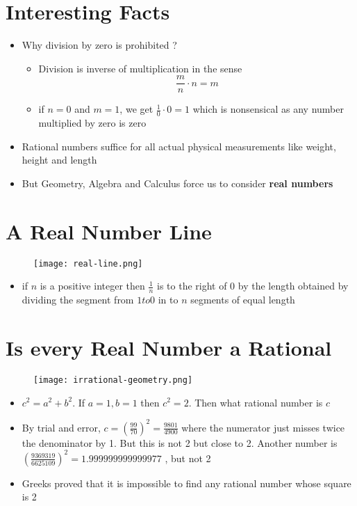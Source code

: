 \section{Interesting Facts}
\begin{itemize}
    \item Why division by zero is prohibited ?
    \begin{itemize}
        \item Division is inverse of multiplication in the sense
        \[
        \frac{m}{n} \cdot n = m
        \]
    \item if \( n=0 \) and \( m = 1\), we get \(\frac{1}{0} \cdot 0 = 1\) which is nonsensical as any number multiplied by zero is zero
    \end{itemize}
    \item Rational numbers suffice for all actual physical measurements like weight, height and length
    \item But Geometry, Algebra and Calculus force us to consider \textbf{real numbers}
\end{itemize}

\section{A Real Number Line}
\begin{figure}[h]
    \centering
    \texttt{[image: real-line.png]}
\end{figure}
\begin{itemize}
    \item if \( n\) is a positive integer then \( \frac{1}{n}\) is to the right of 0 by the length obtained by dividing the segment from \( 1 to 0\) in to \( n \) segments of equal length
\end{itemize}

\section{Is every Real Number a Rational}
\begin{figure}[h]
    \centering
    \texttt{[image: irrational-geometry.png]}
\end{figure}
\begin{itemize}
    \item \( c^{2} = a^{2} + b^{2} \). If \( a = 1, b = 1\) then \(c^{2} = 2 \). Then what rational number is \( c \)
    \item By trial and error, \( c = \left( \frac{99}{70} \right)^{2}  = \frac{9801}{4900}\) where the numerator just misses twice the denominator by 1. But this is not 2 but close to 2. Another number is \( \left( \frac{9369319}{6625109} \right)^{2} = 1.999999999999977\) , but not 2
    \item Greeks proved that it is impossible to find any rational number whose square is 2
\end{itemize}

